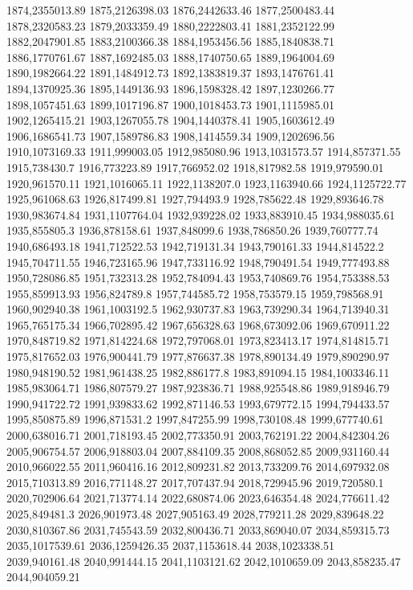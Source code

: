 1874,2355013.89
1875,2126398.03
1876,2442633.46
1877,2500483.44
1878,2320583.23
1879,2033359.49
1880,2222803.41
1881,2352122.99
1882,2047901.85
1883,2100366.38
1884,1953456.56
1885,1840838.71
1886,1770761.67
1887,1692485.03
1888,1740750.65
1889,1964004.69
1890,1982664.22
1891,1484912.73
1892,1383819.37
1893,1476761.41
1894,1370925.36
1895,1449136.93
1896,1598328.42
1897,1230266.77
1898,1057451.63
1899,1017196.87
1900,1018453.73
1901,1115985.01
1902,1265415.21
1903,1267055.78
1904,1440378.41
1905,1603612.49
1906,1686541.73
1907,1589786.83
1908,1414559.34
1909,1202696.56
1910,1073169.33
1911,999003.05
1912,985080.96
1913,1031573.57
1914,857371.55
1915,738430.7
1916,773223.89
1917,766952.02
1918,817982.58
1919,979590.01
1920,961570.11
1921,1016065.11
1922,1138207.0
1923,1163940.66
1924,1125722.77
1925,961068.63
1926,817499.81
1927,794493.9
1928,785622.48
1929,893646.78
1930,983674.84
1931,1107764.04
1932,939228.02
1933,883910.45
1934,988035.61
1935,855805.3
1936,878158.61
1937,848099.6
1938,786850.26
1939,760777.74
1940,686493.18
1941,712522.53
1942,719131.34
1943,790161.33
1944,814522.2
1945,704711.55
1946,723165.96
1947,733116.92
1948,790491.54
1949,777493.88
1950,728086.85
1951,732313.28
1952,784094.43
1953,740869.76
1954,753388.53
1955,859913.93
1956,824789.8
1957,744585.72
1958,753579.15
1959,798568.91
1960,902940.38
1961,1003192.5
1962,930737.83
1963,739290.34
1964,713940.31
1965,765175.34
1966,702895.42
1967,656328.63
1968,673092.06
1969,670911.22
1970,848719.82
1971,814224.68
1972,797068.01
1973,823413.17
1974,814815.71
1975,817652.03
1976,900441.79
1977,876637.38
1978,890134.49
1979,890290.97
1980,948190.52
1981,961438.25
1982,886177.8
1983,891094.15
1984,1003346.11
1985,983064.71
1986,807579.27
1987,923836.71
1988,925548.86
1989,918946.79
1990,941722.72
1991,939833.62
1992,871146.53
1993,679772.15
1994,794433.57
1995,850875.89
1996,871531.2
1997,847255.99
1998,730108.48
1999,677740.61
2000,638016.71
2001,718193.45
2002,773350.91
2003,762191.22
2004,842304.26
2005,906754.57
2006,918803.04
2007,884109.35
2008,868052.85
2009,931160.44
2010,966022.55
2011,960416.16
2012,809231.82
2013,733209.76
2014,697932.08
2015,710313.89
2016,771148.27
2017,707437.94
2018,729945.96
2019,720580.1
2020,702906.64
2021,713774.14
2022,680874.06
2023,646354.48
2024,776611.42
2025,849481.3
2026,901973.48
2027,905163.49
2028,779211.28
2029,839648.22
2030,810367.86
2031,745543.59
2032,800436.71
2033,869040.07
2034,859315.73
2035,1017539.61
2036,1259426.35
2037,1153618.44
2038,1023338.51
2039,940161.48
2040,991444.15
2041,1103121.62
2042,1010659.09
2043,858235.47
2044,904059.21
